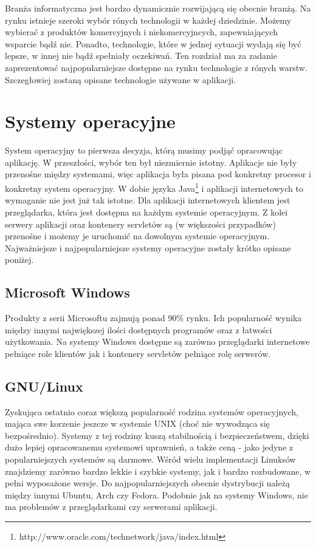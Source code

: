 Branża informatyczna jest bardzo dynamicznie rozwijającą się obecnie branżą.
Na rynku istnieje szeroki wybór rónych technologii w każdej dziedzinie.
Możemy wybierać z produktów komercyjnych i niekomercyjncych, zapewniających wsparcie bądź nie.
Ponadto, technologie, które w jednej sytuacji wydają się być lepsze, w innej nie bądź spełniały oczekiwań.
Ten rozdział ma za zadanie zaprezentować najpopularniejsze dostępne na rynku technologie z rónych warstw.
Szczegłowiej zostaną opisane technologie używane w aplikacji.
\section{Systemy operacyjne}
System operacyjny to pierwsza decyzja, którą musimy podjąć opracowując aplikację.
W przeszłości, wybór ten był niezmiernie istotny.
Aplikacje nie były przenośne między systemami, więc aplikacja była pisana pod konkretny procesor i konkretny system operacyjny.
W dobie języka Java\footnote{http://www.oracle.com/technetwork/java/index.html} i aplikacji internetowych to wymaganie nie jest już tak istotne.
Dla aplikacji internetowych klientem jest przeglądarka, która jest dostępna na każdym systemie operacyjnym.
Z kolei serwery aplikacji oraz kontenery servletów są (w większości przypadków) przenośne i możemy je uruchomić na dowolnym systemie operacyjnym.
Najważniejsze i najpopularniejsze systemy operacyjne zostały krótko opisane poniżej.
    \subsection{Microsoft Windows}
    Produkty z serii Microsoftu zajmują ponad 90\% rynku.
    Ich popularność wynika między innymi największej ilości dostępnych programów oraz z łatwości użytkowania.
    Na systemy Windows dostępne są zarówno przeglądarki internetowe pełniące role klientów jak i kontenery servletów pełniące rolę serwerów.
    \subsection{GNU/Linux}
    Zyskująca ostatnio coraz większą popularność rodzina systemów operacyjnych, mająca swe korzenie jeszcze w systemie UNIX (choć nie wywodząca się bezpośrednio).
    Systemy z tej rodziny kuszą stabilnością i bezpieczeństwem, dzięki dużo lepiej opracowanemu systemowi uprawnień, a także ceną - jako jedyne z popularniejszych systemów są darmowe.
    Wśród wielu implementacji Linuksów znajdziemy zarówno bardzo lekkie i szybkie systemy, jak i bardzo rozbudowane, w pełni wyposażone wersje.
    Do najpopularniejszych obecnie dystrybucji należą między innymi Ubuntu, Arch czy Fedora.
    Podobnie jak na systemy Windows, nie ma problemów z przeglądarkami czy serwerami aplikacji.
